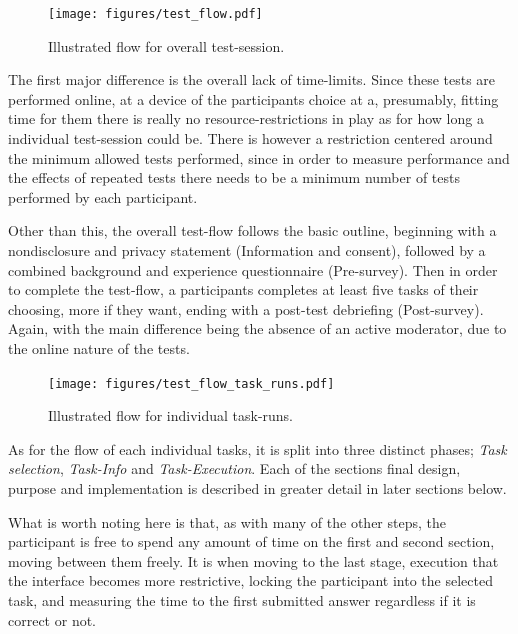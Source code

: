 {  %

  \begin{figure}[h!]
    \centering
    \texttt{[image: figures/test\_flow.pdf]}
    \caption{Illustrated flow for overall test-session.}
  \end{figure}

  The first major difference is the overall lack of time-limits. Since these
  tests are performed online, at a device of the participants choice at a,
  presumably, fitting time for them there is really no resource-restrictions in
  play as for how long a individual test-session could be. There is however a
  restriction centered around the minimum allowed tests performed, since in
  order to measure performance and the effects of repeated tests there needs to
  be a minimum number of tests performed by each participant.

  Other than this, the overall test-flow follows the basic outline, beginning
  with a nondisclosure and privacy statement (Information and consent),
  followed by a combined background and experience questionnaire (Pre-survey).
  Then in order to complete the test-flow, a participants completes at least
  five tasks of their choosing, more if they want, ending with a post-test
  debriefing (Post-survey). Again, with the main difference being the absence
  of an active moderator, due to the online nature of the tests.

  \begin{figure}[h!]
    \centering
    \texttt{[image: figures/test\_flow\_task\_runs.pdf]}
    \caption{Illustrated flow for individual task-runs.}
  \end{figure}

  As for the flow of each individual tasks, it is split into three distinct phases;
  \textit{Task selection},
  \textit{Task-Info} and
  \textit{Task-Execution}.
  Each of the sections final design, purpose and implementation is
  described in greater detail in later sections below.

  What is worth noting here is that, as with many of the other steps, the
  participant is free to spend any amount of time on the first and second
  section, moving between them freely. It is when moving to the last stage,
  execution that the interface becomes more restrictive, locking the
  participant into the selected task, and measuring the time to the first
  submitted answer regardless if it is correct or not.

}

